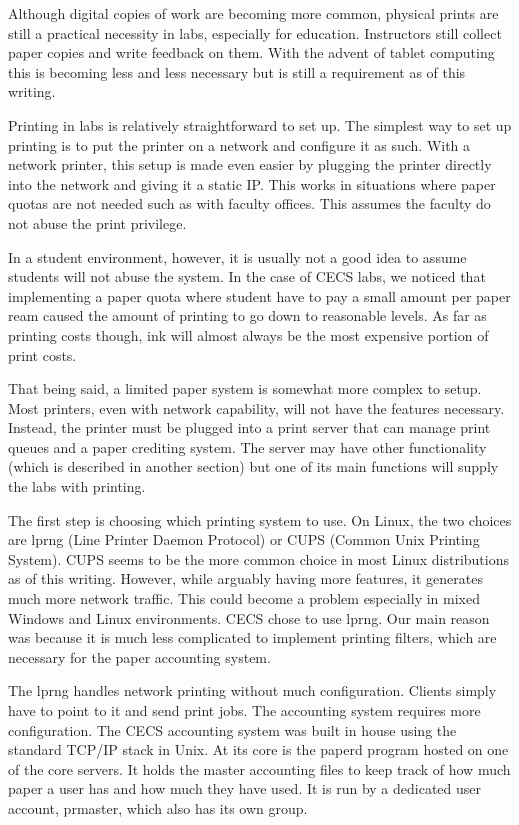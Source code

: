Although digital copies of work are becoming more common, physical prints are still a practical necessity in labs, especially for education.  Instructors still collect paper copies and write feedback on them.  With the advent of tablet computing this is becoming less and less necessary but is still a requirement as of this writing.  

Printing in labs is relatively straightforward to set up.  The simplest way to set up printing is to put the printer on a network and configure it as such.  With a network printer, this setup is made even easier by plugging the printer directly into the network and giving it a static IP.  This works in situations where paper quotas are not needed such as with faculty offices.  This assumes the faculty do not abuse the print privilege.  

In a student environment, however, it is usually not a good idea to assume students will not abuse the system.  In the case of CECS labs, we noticed that implementing a paper quota where student have to pay a small amount per paper ream caused the amount of printing to go down to reasonable levels.  As far as printing costs though, ink will almost always be the most expensive portion of print costs.  

That being said, a limited paper system is somewhat more complex to setup.  Most printers, even with network capability, will not have the features necessary.  Instead, the printer must be plugged into a print server that can manage print queues and a paper crediting system.  The server may have other functionality (which is described in another section) but one of its main functions will supply the labs with printing.  

The first step is choosing which printing system to use.  On Linux, the two choices are lprng (Line Printer Daemon Protocol) or CUPS (Common Unix Printing System).  CUPS seems to be the more common choice in most Linux distributions as of this writing.  However, while arguably having more features, it generates much more network traffic.  This could become a problem especially in mixed Windows and Linux environments.  CECS chose to use lprng.  Our main reason was because it is much less complicated to implement printing filters, which are necessary for the paper accounting system.

The lprng handles network printing without much configuration.  Clients simply have to point to it and send print jobs.  The accounting system requires more configuration.  The CECS accounting system was built in house using the standard TCP/IP stack in Unix.  At its core is the paperd program hosted on one of the core servers.  It holds the master accounting files to keep track of how much paper a user has and how much they have used.  It is run by a dedicated user account, prmaster, which also has its own group.  

